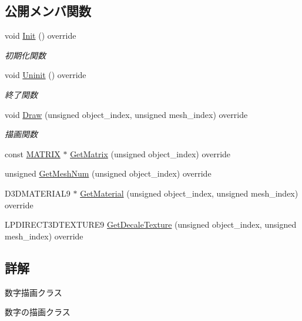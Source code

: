 \subsection*{公開メンバ関数}
\begin{DoxyCompactItemize}
\item 
void \mbox{\hyperlink{class_number_draw_ad52c1e8b9ae6e830a82c440cc18cb6c9}{Init}} () override
\begin{DoxyCompactList}\small\item\em 初期化関数 \end{DoxyCompactList}\item 
void \mbox{\hyperlink{class_number_draw_a2b203d101f23f0d3f584937ff5ad662a}{Uninit}} () override
\begin{DoxyCompactList}\small\item\em 終了関数 \end{DoxyCompactList}\item 
void \mbox{\hyperlink{class_number_draw_a15e4e602b3f9372349d0b6ff9e4fc423}{Draw}} (unsigned object\+\_\+index, unsigned mesh\+\_\+index) override
\begin{DoxyCompactList}\small\item\em 描画関数 \end{DoxyCompactList}\item 
const \mbox{\hyperlink{_vector3_d_8h_a032295cd9fb1b711757c90667278e744}{M\+A\+T\+R\+IX}} $\ast$ \mbox{\hyperlink{class_number_draw_a78f50afa05e728811d89a491f5eec899}{Get\+Matrix}} (unsigned object\+\_\+index) override
\item 
unsigned \mbox{\hyperlink{class_number_draw_a8234fb06d885feaa8a2f0ecf256db9a0}{Get\+Mesh\+Num}} (unsigned object\+\_\+index) override
\item 
D3\+D\+M\+A\+T\+E\+R\+I\+A\+L9 $\ast$ \mbox{\hyperlink{class_number_draw_a3348d9d1cdd9dd03be25b82069275ca5}{Get\+Material}} (unsigned object\+\_\+index, unsigned mesh\+\_\+index) override
\item 
L\+P\+D\+I\+R\+E\+C\+T3\+D\+T\+E\+X\+T\+U\+R\+E9 \mbox{\hyperlink{class_number_draw_ad1d9a4cee49e7bddce51b5c58e739de9}{Get\+Decale\+Texture}} (unsigned object\+\_\+index, unsigned mesh\+\_\+index) override
\end{DoxyCompactItemize}


\subsection{詳解}
数字描画クラス 

数字の描画クラス 

